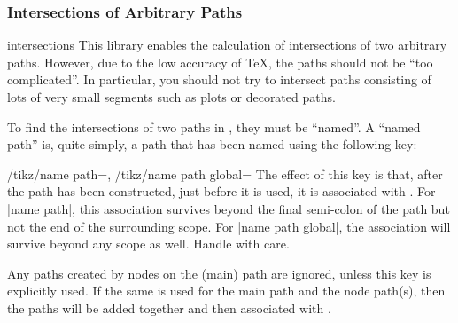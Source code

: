 

\subsubsection{Intersections of Arbitrary Paths}

\begin{tikzlibrary}{intersections}
  This library enables the calculation of intersections of
  two arbitrary paths. However, due to the low accuracy of
  \TeX, the paths should not be ``too complicated''.
  In particular, you should not try to intersect paths consisting of
  lots of very small segments such as plots or decorated paths.
\end{tikzlibrary}

To find the intersections of two paths in \tikzname, they must be
``named''. A ``named path'' is, quite simply, a path that has been
named using the following key:

\begin{keylist}{%
	/tikz/name path=,
	/tikz/name path global=}
  The effect of this key is that, after the path has been constructed,
  just before it is used, it is associated with . For |name path|,
  this association survives beyond the final semi-colon of the path
  but not the end of the surrounding scope. For |name path global|, the association
  will survive beyond any scope as well. Handle with care.

  Any paths created by nodes on the (main) path are ignored, unless
  this key is explicitly used. If the same  is used for the
  main path and the node path(s), then the paths will be added
  together and then associated with .
\end{keylist}

